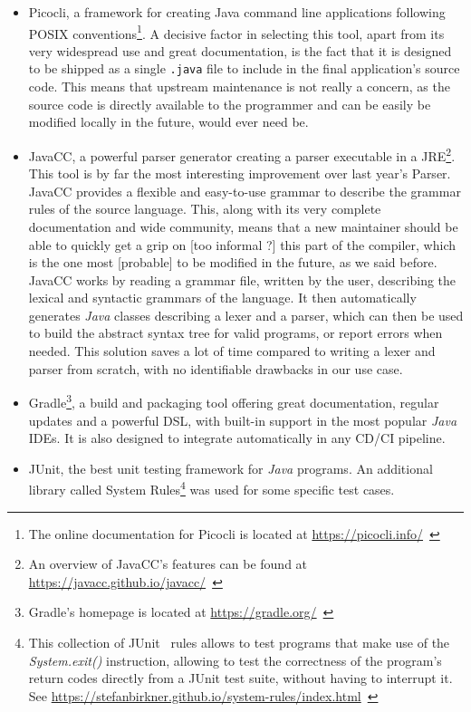 \begin{itemize}
    \item Picocli, a framework for creating Java command line applications following POSIX conventions\footnote{The online documentation for Picocli is located at \url{https://picocli.info/}~\cite{picocli}}.
    A decisive factor in selecting this tool, apart from its very widespread use and great documentation, is the fact that it is designed to be shipped as a single \texttt{.java} file to include in the final application's source code.
    This means that upstream maintenance is not really a concern, as the source code is directly available to the programmer and can be easily be modified locally in the future, would ever need be.
    \item JavaCC, a powerful parser generator creating a parser executable in a JRE\footnote{An overview of JavaCC's features can be found at \url{https://javacc.github.io/javacc/}~\cite{javacc}}.
    This tool is by far the most interesting improvement over last year's Parser.
    JavaCC provides a flexible and easy-to-use grammar to describe the grammar rules of the source language.
    This, along with its very complete documentation and wide community, means that a new maintainer should be able to quickly get a grip on [too informal ?] this part of the compiler, which is the one most [probable] to be modified in the future, as we said before.
    JavaCC works by reading a grammar file, written by the user, describing the lexical and syntactic grammars of the language.
    It then automatically generates \textit{Java} classes describing a lexer and a parser, which can then be used to build the abstract syntax tree for valid programs, or report errors when needed.
    This solution saves a lot of time compared to writing a lexer and parser from scratch, with no identifiable drawbacks in our use case.
    \item Gradle\footnote{Gradle's homepage is located at \url{https://gradle.org/}~\cite{gradle}}, a build and packaging tool offering great documentation, regular updates and a powerful DSL, with built-in support in the most popular \textit{Java} IDEs.
    It is also designed to integrate automatically in any CD/CI pipeline.
    \item JUnit, the best unit testing framework for \textit{Java} programs.
    An additional library called System Rules\footnote{This collection of JUnit~\cite{JUnit} rules allows to test programs that make use of the \textit{System.exit()} instruction, allowing to test the correctness of the program's return codes directly from a JUnit test suite, without having to interrupt it. See \url{https://stefanbirkner.github.io/system-rules/index.html}~\cite{SystemRules}} was used for some specific test cases.
\end{itemize}
